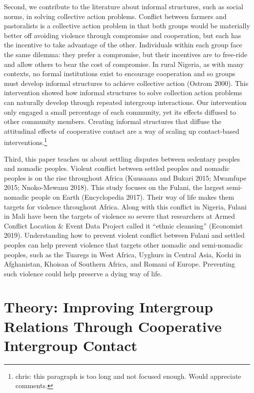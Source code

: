 \documentclass[11pt]{article}
\begin{document}
Second, we contribute to the literature about informal structures, such
as social norms, in solving collective action problems. Conflict between
farmers and pastoralists is a collective action problem in that both
groups would be materially better off avoiding violence through
compromise and cooperation, but each has the incentive to take advantage
of the other. Individuals within each group face the same dilemma: they
prefer a compromise, but their incentives are to free-ride and allow
others to bear the cost of compromise. In rural Nigeria, as with many
contexts, no formal institutions exist to encourage cooperation and so
groups must develop informal structures to achieve collective action
(Ostrom 2000). This intervention showed how informal structures to solve
collection action problems can naturally develop through repeated
intergroup interactions. Our intervention only engaged a small
percentage of each community, yet its effects diffused to other
community members. Creating informal structures that diffuse the
attitudinal effects of cooperative contact are a way of scaling up
contact-based interventions.\footnote{chris: this paragraph is too long
  and not focused enough. Would appreciate comments.}

Third, this paper teaches us about settling disputes between sedentary
peoples and nomadic peoples. Violent conflict between settled peoples
and nomadic peoples is on the rise throughout Africa (Kuusaana and
Bukari 2015; Mwamfupe 2015; Nnoko-Mewanu 2018). This study focuses on
the Fulani, the largest semi-nomadic people on Earth (Encyclopedia
2017). Their way of life makes them targets for violence throughout
Africa. Along with this conflict in Nigeria, Fulani in Mali have been
the targets of violence so severe that researchers at Armed Conflict
Location \& Event Data Project called it ``ethnic cleansing'' (Economist
2019). Understanding how to prevent violent conflict between Fulani and
settled peoples can help prevent violence that targets other nomadic and
semi-nomadic peoples, such as the Tuaregs in West Africa, Uyghurs in
Central Asia, Kochi in Afghanistan, Khoisan of Southern Africa, and
Romani of Europe. Preventing such violence could help preserve a dying
way of life.

\hypertarget{theory-improving-intergroup-relations-through-cooperative-intergroup-contact}{%
\section{Theory: Improving Intergroup Relations Through Cooperative
Intergroup
Contact}\label{theory-improving-intergroup-relations-through-cooperative-intergroup-contact}}
\end{document}
